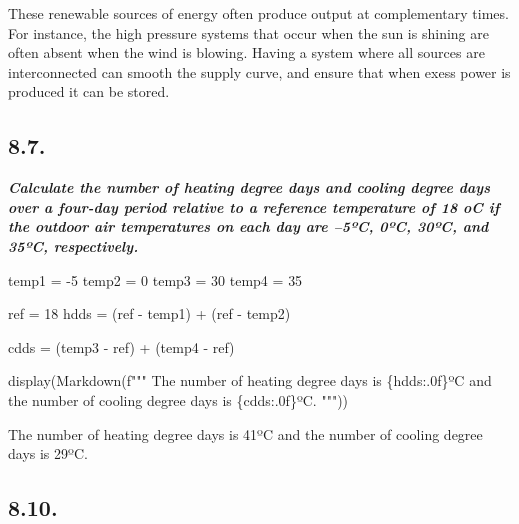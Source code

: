 \documentclass[
  letterpaper,
  DIV=11,
  numbers=noendperiod]{scrartcl}
\newenvironment{Shaded}{\begin{snugshade}}{\end{snugshade}}
\newcommand{\DecValTok}[1]{\textcolor[rgb]{0.68,0.00,0.00}{#1}}
\newcommand{\NormalTok}[1]{\textcolor[rgb]{0.00,0.23,0.31}{#1}}
\newcommand{\OperatorTok}[1]{\textcolor[rgb]{0.37,0.37,0.37}{#1}}
\newcommand{\SpecialCharTok}[1]{\textcolor[rgb]{0.37,0.37,0.37}{#1}}
\newcommand{\SpecialStringTok}[1]{\textcolor[rgb]{0.13,0.47,0.30}{#1}}
\begin{document}
These renewable sources of energy often produce output at complementary
times. For instance, the high pressure systems that occur when the sun
is shining are often absent when the wind is blowing. Having a system
where all sources are interconnected can smooth the supply curve, and
ensure that when exess power is produced it can be stored.

\hypertarget{section-13}{%
\subsection{8.7.}\label{section-13}}

\textbf{\emph{Calculate the number of heating degree days and cooling
degree days over a four-day period relative to a reference temperature
of 18 oC if the outdoor air temperatures on each day are --5ºC, 0ºC,
30ºC, and 35ºC, respectively. }}

\begin{Shaded}
\begin{Highlighting}[]
\NormalTok{temp1 }\OperatorTok{=} \OperatorTok{{-}}\DecValTok{5}
\NormalTok{temp2 }\OperatorTok{=} \DecValTok{0} 
\NormalTok{temp3 }\OperatorTok{=} \DecValTok{30} 
\NormalTok{temp4 }\OperatorTok{=} \DecValTok{35}

\NormalTok{ref }\OperatorTok{=} \DecValTok{18}
\NormalTok{hdds }\OperatorTok{=}\NormalTok{ (ref }\OperatorTok{{-}}\NormalTok{ temp1) }\OperatorTok{+}\NormalTok{ (ref }\OperatorTok{{-}}\NormalTok{ temp2)}

\NormalTok{cdds }\OperatorTok{=}\NormalTok{ (temp3 }\OperatorTok{{-}}\NormalTok{ ref) }\OperatorTok{+}\NormalTok{ (temp4 }\OperatorTok{{-}}\NormalTok{ ref)}

\NormalTok{display(Markdown(}\SpecialStringTok{f"""}
\SpecialStringTok{The number of heating degree days is }\SpecialCharTok{\{}\NormalTok{hdds}\SpecialCharTok{:.0f\}}\SpecialStringTok{ºC and the number of cooling degree days is }\SpecialCharTok{\{}\NormalTok{cdds}\SpecialCharTok{:.0f\}}\SpecialStringTok{ºC.}
\SpecialStringTok{"""}\NormalTok{))}
\end{Highlighting}
\end{Shaded}

The number of heating degree days is 41ºC and the number of cooling
degree days is 29ºC.

\hypertarget{section-14}{%
\subsection{8.10.}\label{section-14}}
\end{document}
